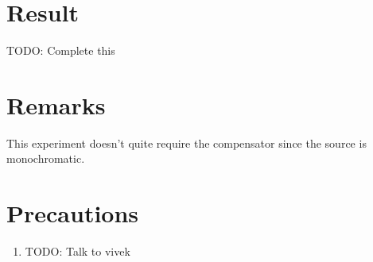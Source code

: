 \section{Result}
	TODO: Complete this

\section{Remarks}
	This experiment doesn't quite require the compensator since the source is monochromatic.

\section{Precautions}
	\begin{enumerate}		
		\item TODO: Talk to vivek
	\end{enumerate}